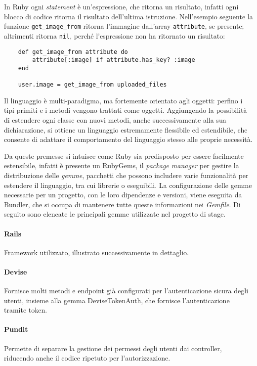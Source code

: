 \noindent In Ruby ogni \emph{statement} è un'espressione, che ritorna un risultato, infatti ogni blocco di codice ritorna il risultato dell'ultima istruzione. Nell'esempio seguente la funzione \verb|get_image_from| ritorna l'immagine dall'array \verb|attribute|, se presente; altrimenti ritorna \verb|nil|, perché l'espressione non ha ritornato un risultato:
\begin{verbatim}
	def get_image_from attribute do
		attribute[:image] if attribute.has_key? :image
	end

	user.image = get_image_from uploaded_files
\end{verbatim}

\noindent Il linguaggio è multi-paradigma, ma fortemente orientato agli oggetti: perfino i tipi primiti e i metodi vengono trattati come oggetti. Aggiungendo la possibilità di estendere ogni classe con nuovi metodi, anche successivamente alla sua dichiarazione, si ottiene un linguaggio estremamente flessibile ed estendibile, che consente di adattare il comportamento del linguaggio stesso alle proprie necessità.

Da queste premesse si intuisce come Ruby sia predisposto per essere facilmente estensibile, infatti è presente un RubyGems, il \emph{package manager} per gestire la distribuzione delle \emph{gemme}, pacchetti che possono includere varie funzionalità per estendere il linguaggio, tra cui librerie o eseguibili. La configurazione delle gemme necessarie per un progetto, con le loro dipendenze e versioni, viene eseguita da Bundler, che si occupa di mantenere tutte queste informazioni nei \emph{Gemfile}. Di seguito sono elencate le principali gemme utilizzate nel progetto di stage.
\paragraph{Rails} Framework utilizzato, illustrato successivamente in dettaglio.
\paragraph{Devise} Fornisce molti metodi e endpoint già configurati per l'autenticazione sicura degli utenti, insieme alla gemma DeviseTokenAuth, che fornisce l'autenticazione tramite token.
\paragraph{Pundit} Permette di separare la gestione dei permessi degli utenti dai controller, riducendo anche il codice ripetuto per l'autorizzazione.

